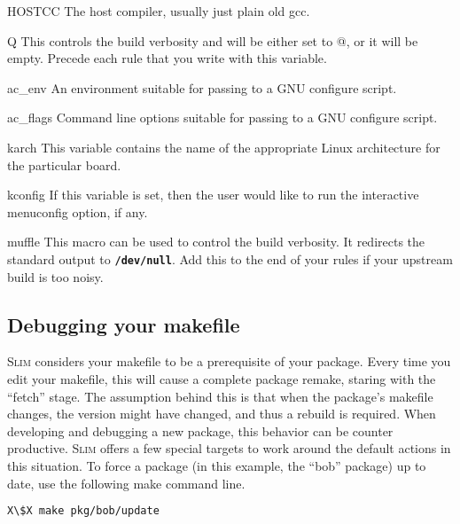 \documentclass[a4paper,10pt]{article}
\newenvironment{Description}[1][\quad]{%
  \begin{list}{}{%
      \renewcommand{\makelabel}[1]{\textbf{##1}\hfill}%
      \settowidth{\labelwidth}{\textbf{#1}}%
      \setlength{\leftmargin}{\labelwidth+\labelsep}%
  }%
}{%
  \end{list}%
}
\newcommand{\slim}{\textsc{Slim}\xspace}
\newcommand{\fw}{\tt\bf}
\begin{document}
\begin{Description}[HOSTCCX]
    \item[HOSTCC]
      The host compiler, usually just plain old gcc.

    \item[Q]
      This controls the build verbosity and will be either set to @,
      or it will be empty. Precede each rule that you write with this
      variable.

    \item[ac\_env]
      An environment suitable for passing to a GNU configure script.

    \item[ac\_flags]
      Command line options suitable for passing to a GNU configure
      script.

    \item[karch]
      This variable contains the name of the appropriate Linux
      architecture for the particular board.

    \item[kconfig]
      If this variable is set, then the user would like to run the
      interactive menuconfig option, if any.

    \item[muffle]
      This macro can be used to control the build verbosity. It
      redirects the standard output to {\fw /dev/null}. Add this to
      the end of your rules if your upstream build is too noisy.

    \end{Description}

\subsection{Debugging your makefile}

    \slim considers your makefile to be a prerequisite of your
    package. Every time you edit your makefile, this will cause a
    complete package remake, staring with the ``fetch'' stage.
    The assumption behind this is that when the package's makefile
    changes, the version might have changed, and thus a rebuild is
    required. When developing and debugging a new package, this
    behavior can be counter productive. \slim offers a few special
    targets to work around the default actions in this situation.
    To force a package (in this example, the ``bob'' package) up
    to date, use the following make command line.

\begin{lstlisting}[language=bash,escapechar=X]
X\$X make pkg/bob/update
\end{lstlisting}
\end{document}
